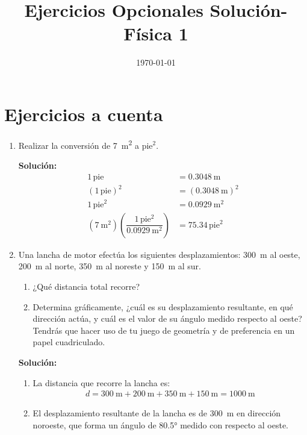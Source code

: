 \documentclass[14pt]{extarticle}
\title{\vspace*{-2cm} Ejercicios Opcionales Solución- Física 1\vspace{-5ex}}
\date{\today}
\begin{document}
\maketitle

\section{Ejercicios a cuenta}

\begin{enumerate}
\item Realizar la conversión de \SI{7}{\square\meter} a pie$^{2}$.

\textbf{Solución:}
\begin{align*}
1 \, \text{pie} &= \SI{0.3048}{\meter} \\[0.5em]
\left( 1 \, \text{pie} \right)^{2} &= \left( \SI{0.3048}{\meter} \right)^{2} \\[0.5em]
1 \, \text{pie}^{2} &= \SI{0.0929}{\square\meter} \\[0.5em]
\left(\SI{7}{\square\meter}  \right) \left( \dfrac{1 \, \text{pie}^{2}}{\SI{0.0929}{\square\meter}} \right) &= 75.34 \, \text{pie}^{2} 
\end{align*}
\item Una lancha de motor efectúa los siguientes desplazamientos: \SI{300}{\meter} al oeste, \SI{200}{\meter} al norte, \SI{350}{\meter} al noreste y \SI{150}{\meter} al sur.
\begin{enumerate}[label=\alph*)]
\item ¿Qué distancia total recorre?
\item Determina gráficamente, ¿cuál es su desplazamiento resultante, en qué dirección actúa, y cuál es el valor de su ángulo medido respecto al oeste? Tendrás que hacer uso de tu juego de geometría y de preferencia en un papel cuadriculado.
\end{enumerate}

\textbf{Solución:}
\begin{enumerate}
\item La distancia que recorre la lancha es:
\begin{align*}
d = \SI{300}{\meter} + \SI{200}{\meter} + \SI{350}{\meter} + \SI{150}{\meter} = \SI{1000}{\meter}
\end{align*}
\item El desplazamiento resultante de la lancha es de \SI{300}{\meter} en dirección noroeste, que forma un ángulo de \ang{80.5} medido con respecto al oeste.
\begin{figure}[H]
    \centering
\end{figure}
\end{enumerate}
\end{enumerate}
\end{document}
